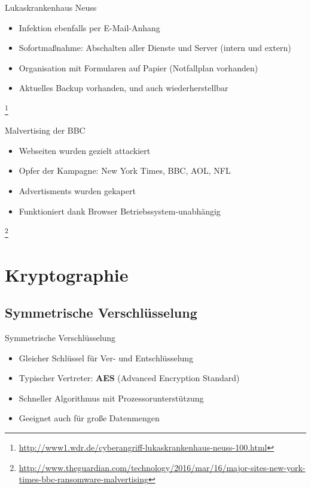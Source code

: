 \documentclass[notes,10pt]{beamer}
\begin{document}
\begin{frame}{Lukaskrankenhaus Neuss}

	\begin{itemize}
		\item Infektion ebenfalls per E-Mail-Anhang
		\item Sofortmaßnahme: Abschalten aller Dienste und Server (intern und extern) \pause
		\item Organisation mit Formularen auf Papier (Notfallplan vorhanden)
		\item Aktuelles Backup vorhanden\pause , und auch wiederherstellbar
	\end{itemize}
	\let\thefootnote\relax\footnote{\url{http://www1.wdr.de/cyberangriff-lukaskrankenhaus-neuss-100.html}}
\end{frame}

\begin{frame}{Malvertising der BBC}

	\begin{itemize}
		\item Webseiten wurden gezielt attackiert
		\item Opfer der Kampagne: New York Times, BBC, AOL, NFL
		\item Advertisments wurden gekapert
		\item Funktioniert dank Browser Betriebssystem-unabhängig
	\end{itemize}
	\let\thefootnote\relax\footnote{\url{http://www.theguardian.com/technology/2016/mar/16/major-sites-new-york-times-bbc-ransomware-malvertising}}
\end{frame}

\section{Kryptographie}
\subsection{Symmetrische Verschlüsselung}
\begin{frame}{Symmetrische Verschlüsselung}
	\begin{itemize}
		\item Gleicher Schlüssel für Ver- und Entschlüsselung
		\item Typischer Vertreter: \textbf{AES} (Advanced Encryption Standard)
		\item Schneller Algorithmus mit Prozessorunterstützung
		\item Geeignet auch für große Datenmengen
	\end{itemize}
\end{frame}
\end{document}
